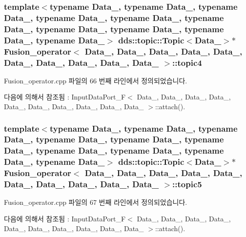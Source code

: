 \subsubsection[{\texorpdfstring{topic4}{topic4}}]{\setlength{\rightskip}{0pt plus 5cm}template$<$typename Data\+\_, typename Data\+\_, typename Data\+\_, typename Data\+\_, typename Data\+\_, typename Data\+\_, typename Data\+\_, typename Data\+\_, typename Data\+\_, typename Data\+\_$>$ dds\+::topic\+::\+Topic$<$Data\+\_$>$$\ast$ {\bf Fusion\+\_\+operator}$<$ Data\+\_, Data\+\_, Data\+\_, Data\+\_, Data\+\_, Data\+\_, Data\+\_, Data\+\_, Data\+\_, Data\+\_ $>$\+::topic4}\hypertarget{classFusion__operator_a2436ee57380c11e74b971df67d23c06a}{}\label{classFusion__operator_a2436ee57380c11e74b971df67d23c06a}


Fusion\+\_\+operator.\+cpp 파일의 66 번째 라인에서 정의되었습니다.



다음에 의해서 참조됨 \+:  Input\+Data\+Port\+\_\+\+F$<$ Data\+\_, Data\+\_, Data\+\_, Data\+\_, Data\+\_, Data\+\_, Data\+\_, Data\+\_, Data\+\_, Data\+\_ $>$\+::attach().

\subsubsection[{\texorpdfstring{topic5}{topic5}}]{\setlength{\rightskip}{0pt plus 5cm}template$<$typename Data\+\_, typename Data\+\_, typename Data\+\_, typename Data\+\_, typename Data\+\_, typename Data\+\_, typename Data\+\_, typename Data\+\_, typename Data\+\_, typename Data\+\_$>$ dds\+::topic\+::\+Topic$<$Data\+\_$>$$\ast$ {\bf Fusion\+\_\+operator}$<$ Data\+\_, Data\+\_, Data\+\_, Data\+\_, Data\+\_, Data\+\_, Data\+\_, Data\+\_, Data\+\_, Data\+\_ $>$\+::topic5}\hypertarget{classFusion__operator_a610b159b6f22ca65f11d2db2c1b2124b}{}\label{classFusion__operator_a610b159b6f22ca65f11d2db2c1b2124b}


Fusion\+\_\+operator.\+cpp 파일의 67 번째 라인에서 정의되었습니다.



다음에 의해서 참조됨 \+:  Input\+Data\+Port\+\_\+\+F$<$ Data\+\_, Data\+\_, Data\+\_, Data\+\_, Data\+\_, Data\+\_, Data\+\_, Data\+\_, Data\+\_, Data\+\_ $>$\+::attach().

